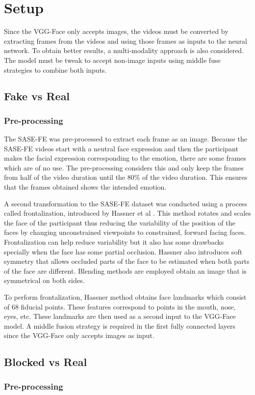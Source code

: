 \chapter{Setup}
Since the VGG-Face only accepts images, the videos must be converted by extracting frames from the videos and using those frames as inputs to the neural network. To obtain better results, a multi-modality approach is also considered. The model must be tweak to accept non-image inputs using middle fuse strategies to combine both inputs.

\section{Fake vs Real}

\subsection{Pre-processing}

The SASE-FE was pre-processed to extract each frame as an image. Because the SASE-FE videos start with a neutral face expression and then the participant makes the facial expression corresponding to the emotion, there are some frames which are of no use. The pre-processing considers this and only keep the frames from half of the video duration until the 80\% of the video duration. This ensures that the frames obtained shows the intended emotion.

A second transformation to the SASE-FE dataset was conducted using a process called frontalization, introduced by Hassner et al \cite{HassnerEffectiveImages}. This method rotates and scales the face of the participant thus reducing the variability of the position of the faces by changing unconstrained viewpoints to constrained, forward facing faces. Frontalization can help reduce variability but it also has some drawbacks specially when the face has some partial occlusion. Hassner also introduces soft symmetry that allows occluded parts of the face to be estimated when both parts of the face are different. Blending methods are employed obtain an image that is symmetrical on both sides.



To perform frontalization, Hassner method \cite{HassnerEffectiveImages} obtains face landmarks which consist of 68 fiducial points. These features correspond to points in the mouth, nose, eyes, etc. These landmarks are then used as a second input to the VGG-Face model. A middle fusion strategy is required in the first fully connected layers since the VGG-Face only accepts images as input.



\section{Blocked vs Real}

\subsection{Pre-processing}

